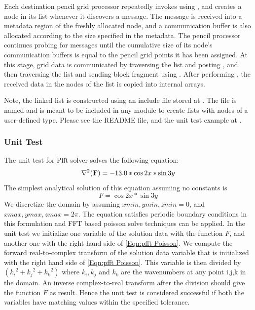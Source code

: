 Each destination pencil grid processor repeatedly invokes
 using , and creates a node in
its  list whenever it discovers a message.  The 
message is received into a metadata region of the freshly allocated
node, and a communication buffer is also allocated according to the
size specified in the metadata.  The pencil processor continues
probing for messages until the cumulative size of its node's
communication buffers is equal to the pencil grid points it has been
assigned.  At this stage, grid data is communicated by traversing the
 list and posting , and then traversing
the  list and sending block fragment using
.  After performing , the received data in the 
nodes of the  list is copied into internal  arrays.

Note, the linked list is constructed using an include file stored at
.  The file is named
 and is meant to be included in any
 module to create lists with nodes of
a user-defined type.  Please see the README file, and the unit test
example at .


\subsubsection{Unit Test}
\label{Sec:GridSolversPfftUnitTests}

The unit test for Pfft solver solves the following equation:
\begin{equation}
\label{Eqn:pfft Poisson}
\nabla^2({\bf F})=-13.0*\cos2x*\sin3y
\end{equation}
The simplest analytical solution of this equation assuming no
constants is
\begin{equation}
F=\cos2x*\sin3y
\end{equation}
We discretize the domain by assuming $xmin,ymin,zmin=0$, and
$xmax,ymax,zmax=2\pi$. The equation satisfies periodic boundary
conditions in this formulation and FFT based poisson solve techniques
can be applied. In the unit test we initialize one variable of the
solution data with the function $F$, and another one
with the right hand side of  \eqref{Eqn:pfft Poisson}. We
compute the forward real-to-complex transform of the solution data
variable that is initialized with the right hand side of \eqref{Eqn:pfft
Poisson}.  This variable is then divided by  
$({k_i}^2+{k_j}^2+{k_k}^2)$ where ${k_i, k_j}$ and ${k_k}$ are the
wavenumbers at any point {i,j,k} in the domain. An inverse complex-to-real
transform after the division should give the function $F$ as
result. Hence the unit test is considered successful if both the
variables have matching values within the specified tolerance.

